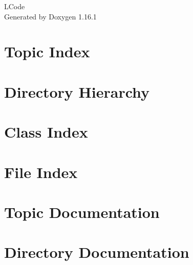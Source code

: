 \documentclass[twoside]{book}
\newcommand{\+}{\discretionary{\mbox{\scriptsize$\hookleftarrow$}}{}{}}
\newcommand{\clearemptydoublepage}{%
    \newpage{\pagestyle{empty}\cleardoublepage}%
  }
\begin{document}
  \raggedbottom
    \hypersetup{pageanchor=false,
                bookmarksnumbered=true,
                pdfencoding=unicode
               }
  \begin{titlepage}
  \vspace*{7cm}
  \begin{center}%
  {\Large LCode}\\
  \vspace*{1cm}
  {\large Generated by Doxygen 1.16.1}\\
  \end{center}
  \end{titlepage}
  \clearemptydoublepage
  \tableofcontents
  \clearemptydoublepage
  \hypersetup{pageanchor=true}
\chapter{Topic Index}

\chapter{Directory Hierarchy}

\chapter{Class Index}

\chapter{File Index}

\chapter{Topic Documentation}


\chapter{Directory Documentation}














\end{document}
